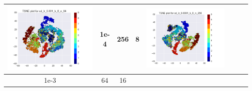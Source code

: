 \documentclass[12pt]{report}
\begin{document}
\begin{table}[H]
\begin{tabular}{ | c | c | c | c || c | c | c| c |}
\begin{minipage}{.3\textwidth}
      \includegraphics[scale=0.25]{cd_lr_0_001_k_8_n_64.png}
    \end{minipage}
	&
    1e-4 & 256 & 8 &
    \begin{minipage}{.3\textwidth}
      \includegraphics[scale=0.25]{cd_lr_0_0001_k_8_n_256.png}
    \end{minipage}
    \\ \hline
    1e-3 & 64 & 16 &
    \begin{minipage}{.3\textwidth}

\end{minipage}
\end{tabular}
\end{table}
\end{document}
